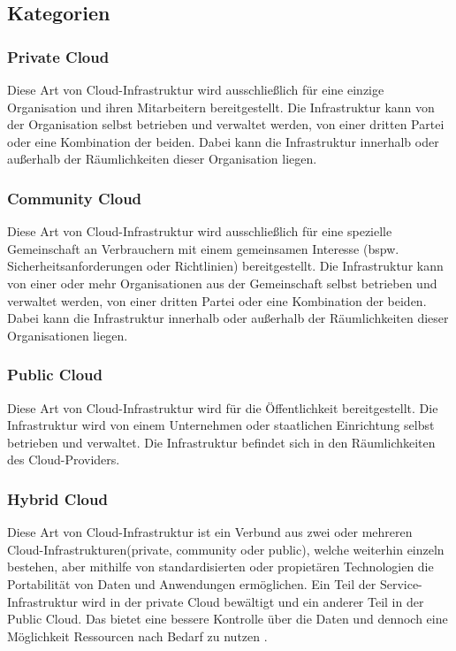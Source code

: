 \subsection{Kategorien}
\subsubsection{Private Cloud}
Diese Art von Cloud-Infrastruktur wird ausschließlich für eine einzige Organisation und ihren Mitarbeitern bereitgestellt. Die Infrastruktur kann von der Organisation selbst betrieben und verwaltet werden, von einer dritten Partei oder eine Kombination der beiden. Dabei kann die Infrastruktur innerhalb oder außerhalb der Räumlichkeiten dieser Organisation liegen\cite{nist_definition}.

\subsubsection{Community Cloud}
Diese Art von Cloud-Infrastruktur wird ausschließlich für eine spezielle Gemeinschaft an Verbrauchern mit einem gemeinsamen Interesse (bspw. Sicherheitsanforderungen oder Richtlinien) bereitgestellt. Die Infrastruktur kann von einer oder mehr Organisationen aus der Gemeinschaft selbst betrieben und verwaltet werden, von einer dritten Partei oder eine Kombination der beiden. Dabei kann die Infrastruktur innerhalb oder außerhalb der Räumlichkeiten dieser Organisationen liegen\cite{nist_definition}.

\subsubsection{Public Cloud}
Diese Art von Cloud-Infrastruktur wird für die Öffentlichkeit bereitgestellt. Die Infrastruktur wird von einem Unternehmen oder staatlichen Einrichtung selbst betrieben und verwaltet. Die Infrastruktur befindet sich in den Räumlichkeiten des Cloud-Providers\cite{nist_definition}.

\subsubsection{Hybrid Cloud}
Diese Art von Cloud-Infrastruktur ist ein Verbund aus zwei oder mehreren Cloud-Infrastrukturen(private, community oder public), welche weiterhin einzeln bestehen, aber mithilfe von standardisierten oder propietären Technologien die Portabilität von Daten und Anwendungen ermöglichen\cite{nist_definition}. Ein Teil der Service-Infrastruktur wird in der private Cloud bewältigt und ein anderer Teil in der Public Cloud. Das bietet eine bessere Kontrolle über die Daten und dennoch eine Möglichkeit Ressourcen nach Bedarf zu nutzen \cite{study_cc_cdb}.

